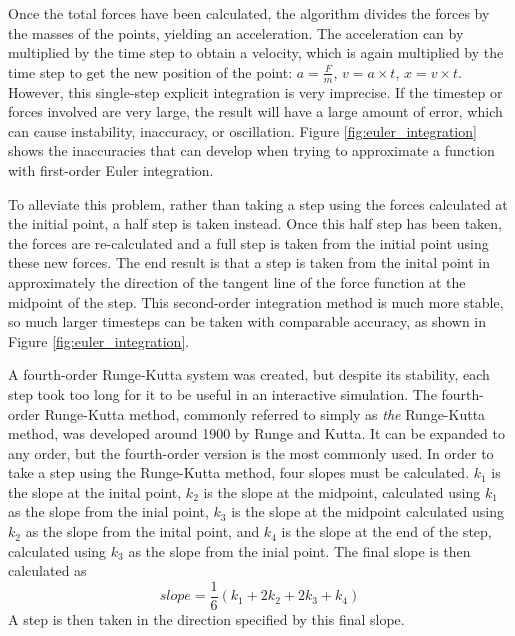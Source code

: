 \documentclass{thesis}
\begin{document}
Once the total forces have been calculated, the algorithm divides the forces by the masses of the points, yielding an acceleration.
The acceleration can by multiplied by the time step to obtain a velocity, which is again multiplied by the time step to get the new
position of the point: $a=\frac{F}{m}$, $v=a\times t$, $x=v\times t$.
However, this single-step explicit integration is very imprecise.  If the timestep or forces involved are very large, the result will
have a large amount of error, which can cause instability, inaccuracy, or oscillation.  Figure \ref{fig:euler_integration} shows the
inaccuracies that can develop when trying to approximate a function with first-order Euler integration.

To alleviate this problem, rather than taking a step using the forces calculated at the initial point, a half step is taken instead.
Once this half step has been taken, the forces are re-calculated and a full step is taken from the initial point using these new forces.
The end result is that a step is taken from the inital point in approximately the direction of the tangent line of the force function at
the midpoint of the step. This second-order integration method is much more stable, so much larger timesteps can be taken with comparable
accuracy, as shown in Figure \ref{fig:euler_integration}.

A fourth-order Runge-Kutta system was created, but despite its stability, each step took too long for it to be useful in an interactive
simulation.  The fourth-order Runge-Kutta method, commonly referred to simply as \emph{the} Runge-Kutta method, was developed around 1900
by Runge and Kutta.  It can be expanded to any order, but the fourth-order version is the most commonly used.  In order to take a step
using the Runge-Kutta method, four slopes must be calculated.  $k_1$ is the slope at the inital point, $k_2$ is the slope at the midpoint,
calculated using $k_1$ as the slope from the inial point, $k_3$ is the slope at the midpoint calculated using $k_2$ as the slope from the
inital point, and $k_4$ is the slope at the end of the step, calculated using $k_3$ as the slope from the inial point.  The final slope
is then calculated as \[slope=\frac{1}{6}(k_1+2k_2+2k_3+k_4)\]  A step is then taken in the direction specified by this final slope.
\end{document}
